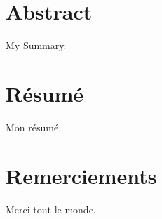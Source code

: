 \cleardoublepage
\setcounter{page}{1}

\chapter{Abstract}

My Summary.
\cleardoublepage


\chapter{R\'esum\'e}


Mon résumé.


\cleardoublepage
\chapter{Remerciements}


Merci tout le monde.

